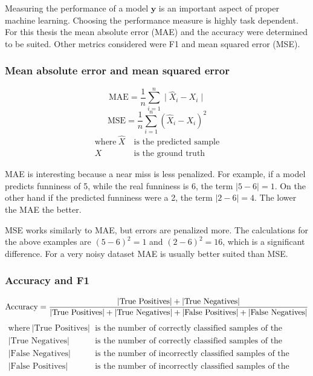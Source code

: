 \documentclass[draft,final,oneside]{vutinfth} %
\begin{document}
Measuring the performance of a model $\boldsymbol{y}$ is an important aspect of proper machine learning. Choosing the performance measure is highly task dependent. For this thesis the mean absolute error (MAE) and the accuracy were determined to be suited. Other metrics considered were F1 and mean squared error (MSE).

\subsubsection{Mean absolute error and mean squared error}
\begin{equation}
\text{MAE} = \frac{1}{n}\textstyle \sum_{i=1}^n \displaystyle\mid \hat{X}_i - X_i \mid
\end{equation}
\begin{equation}
\text{MSE} = \frac{1}{n}\textstyle \sum_{i=1}^n \displaystyle\left( \hat{X}_i - X_i \right)^2
\end{equation}
\begin{align*}
\text{where}~\hat{X}&~\text{is the predicted sample} \\
X&~\text{is the ground truth}
\end{align*}

MAE is interesting because a near miss is less penalized. For example, if a model predicts funniness of 5, while the real funniness is 6, the term $\mid 5 - 6 \mid = 1$. On the other hand if the predicted funniness were a 2, the term $\mid 2 - 6 \mid = 4$. The lower the MAE the better.

MSE works similarly to MAE, but errors are penalized more. The calculations for the above examples are $\left( 5 - 6 \right)^2 = 1$ and $\left( 2 - 6 \right)^2 = 16$, which is a significant difference. For a very noisy dataset MAE is usually better suited than MSE.

\subsubsection{Accuracy and F1}

\begin{equation}
\text{Accuracy}=\frac{|\text{True Positives}| + |\text{True Negatives}|} {|\text{True Positives}| + |\text{True Negatives}| + |\text{False Positives}| + |\text{False Negatives}|}\\
\end{equation}
\begin{align*}
\text{where}~|\text{True Positives}|&~\text{is the number of correctly classified samples of the positive class} \\
|\text{True Negatives}|&~\text{is the number of correctly classified samples of the negative class} \\
|\text{False Negatives}|&~\text{is the number of incorrectly classified samples of the negative class} \\
|\text{False Positives}|&~\text{is the number of incorrectly classified samples of the positive class} \\
\end{align*}
\end{document}
